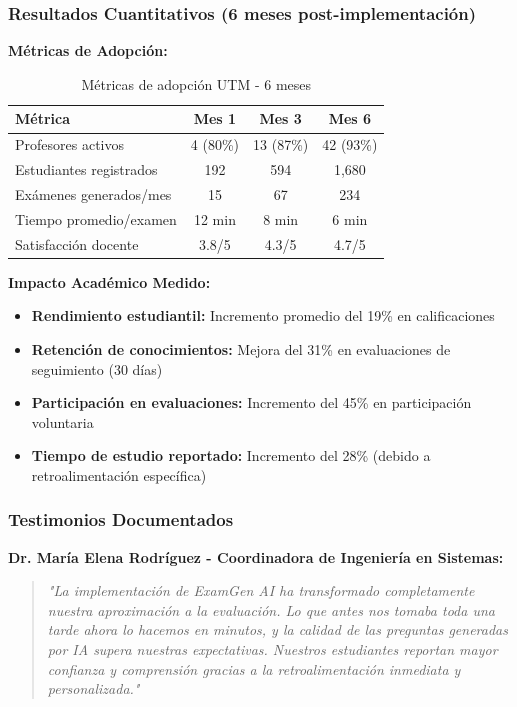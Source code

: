 \documentclass[12pt,a4paper]{report}
\begin{document}
\subsubsection{Resultados Cuantitativos (6 meses post-implementación)}

\textbf{Métricas de Adopción:}
\begin{table}[h]
\centering
\caption{Métricas de adopción UTM - 6 meses}
\begin{tabular}{|l|c|c|c|}
\hline
\textbf{Métrica} & \textbf{Mes 1} & \textbf{Mes 3} & \textbf{Mes 6} \\
\hline
Profesores activos & 4 (80\%) & 13 (87\%) & 42 (93\%) \\
\hline
Estudiantes registrados & 192 & 594 & 1,680 \\
\hline
Exámenes generados/mes & 15 & 67 & 234 \\
\hline
Tiempo promedio/examen & 12 min & 8 min & 6 min \\
\hline
Satisfacción docente & 3.8/5 & 4.3/5 & 4.7/5 \\
\hline
\end{tabular}
\end{table}

\textbf{Impacto Académico Medido:}
\begin{itemize}
\item \textbf{Rendimiento estudiantil:} Incremento promedio del 19\% en calificaciones
\item \textbf{Retención de conocimientos:} Mejora del 31\% en evaluaciones de seguimiento (30 días)
\item \textbf{Participación en evaluaciones:} Incremento del 45\% en participación voluntaria
\item \textbf{Tiempo de estudio reportado:} Incremento del 28\% (debido a retroalimentación específica)
\end{itemize}

\subsubsection{Testimonios Documentados}

\textbf{Dr. María Elena Rodríguez - Coordinadora de Ingeniería en Sistemas:}
\begin{quote}
\textit{"La implementación de ExamGen AI ha transformado completamente nuestra aproximación a la evaluación. Lo que antes nos tomaba toda una tarde ahora lo hacemos en minutos, y la calidad de las preguntas generadas por IA supera nuestras expectativas. Nuestros estudiantes reportan mayor confianza y comprensión gracias a la retroalimentación inmediata y personalizada."}
\end{quote}
\end{document}
